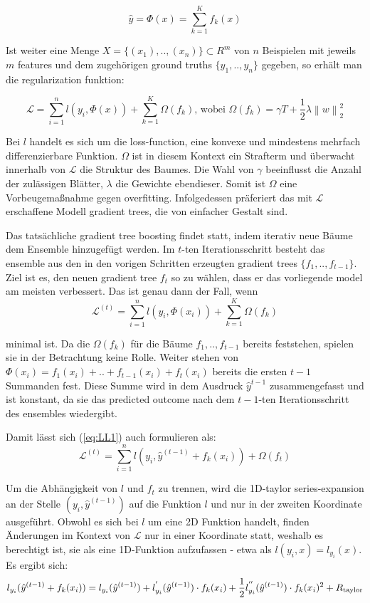 \documentclass[a4paper,12pt]{scrartcl}
\newcommand{\LL}{\ensuremath{\mathcal{L}}}
\newcommand{\norm}[1]{\left\| #1 \right\|}
\begin{document}
 $$\hat{y} = \Phi(x) = \sum_{k=1}^{K} f_k(x)$$

Ist weiter eine Menge $X= \{(x_1), .. ,(x_n)\} \subset R^{m} $ von $n$ Beispielen mit jeweils $m$ features und dem zugehörigen ground truths $\{y_1, .. ,y_n\}$ gegeben, so erhält man die regularization funktion:

$$\mathcal{L} = \sum_{i=1}^{n} l(y_i, \Phi(x)) + \sum_{k=1}^{K}\Omega(f_k) \text{,  wobei } \Omega(f_k) = \gamma T + \frac{1}{2}\lambda \norm{w}_2^2$$

Bei $l$ handelt es sich um die loss-function, eine konvexe und mindestens mehrfach differenzierbare Funktion. $\Omega$ ist in diesem Kontext ein Strafterm und überwacht innerhalb von $\LL$ die Struktur des Baumes. Die Wahl von $\gamma$ beeinflusst die Anzahl der zulässigen Blätter, $\lambda$ die Gewichte ebendieser. Somit ist $\Omega$ eine Vorbeugemaßnahme gegen overfitting. Infolgedessen präferiert das mit $\LL$ erschaffene Modell gradient trees, die von einfacher Gestalt sind.


Das tatsächliche gradient tree boosting findet statt, indem iterativ neue Bäume dem Ensemble hinzugefügt werden. Im $t$-ten Iterationsschritt besteht das ensemble aus den in den vorigen Schritten erzeugten gradient trees $\{f_1, .. , f_{t-1}\}$. Ziel ist es, den neuen gradient tree $f_t$ so zu wählen, dass er das vorliegende model am meisten verbessert. Das ist genau dann der Fall, wenn
\begin{equation}
	\LL^{(t)} = \sum_{i=1}^{n} l(y_i, \Phi(x_i)) + \sum_{k=1}^{K}\Omega(f_k)
	\label{eq:LL1}
\end{equation}

minimal ist. Da die $\Omega(f_k)$ für die Bäume $f_1, .. , f_{t-1}$ bereits feststehen, spielen sie in der Betrachtung keine Rolle. Weiter stehen von $\Phi(x_i) = f_1(x_i) + .. + f_{t-1}(x_i) + f_t(x_i)$ bereits die ersten $t-1$ Summanden fest. Diese Summe wird in dem Ausdruck $\hat{y}^{t-1}$ zusammengefasst und ist konstant, da sie das predicted outcome nach dem $t-1$-ten Iterationsschritt des ensembles wiedergibt.

Damit lässt sich (\ref{eq:LL1}) auch formulieren als:
\begin{equation}
    \LL^{(t)} = \sum_{i=1}^{n} l(y_i, \hat{y}^{(t-1)} + f_k(x_i)) + \Omega(f_t)
    \label{eq:LL2}
\end{equation}

Um die Abhängigkeit von $l$ und $f_t$ zu trennen, wird die 1D-taylor series-expansion an der Stelle $(y_i,\hat{y}^{(t-1)})$ auf die Funktion $l$ und nur in der zweiten Koordinate ausgeführt. Obwohl es sich bei $l$ um eine 2D Funktion handelt, finden Änderungen im Kontext von $\LL$ nur in einer Koordinate statt, weshalb es berechtigt ist, sie als eine 1D-Funktion aufzufassen - etwa als $l(y_i,x) = l_{y_i}(x)$. Es ergibt sich:
\begin{equation}
\label{eq:taylor}
l_{y_i}(\hat{y}^{(t-1)} + f_k(x_i)) = l_{y_i}(\hat{y}^{(t-1)}) + l_{y_i}^{'}(\hat{y}^{(t-1)}) \cdot f_k(x_i)
+ \newline \frac{1}{2} l_{y_i}^{''}(\hat{y}^{(t-1)}) \cdot f_k(x_i)^2 + R_\text{taylor}
\end{equation}
\end{document}
